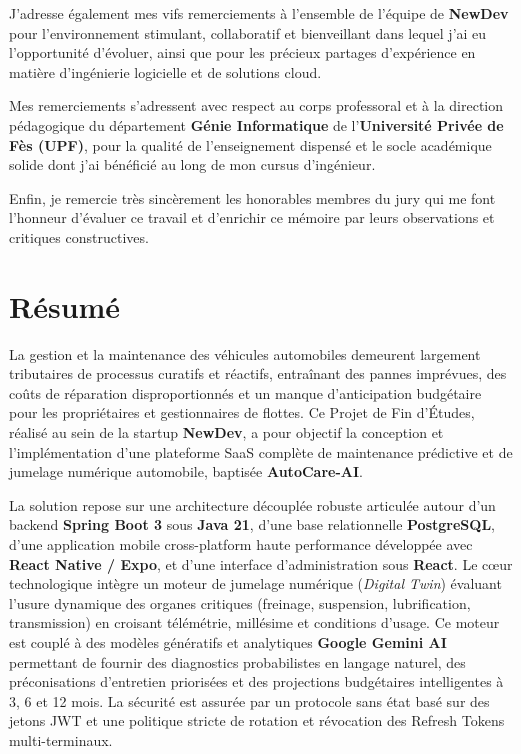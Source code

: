 \documentclass[12pt,a4paper,twoside,openright]{report}
\begin{document}
  J'adresse \'egalement mes vifs remerciements \`a l'ensemble de l'\'equipe de \textbf{NewDev} pour l'environnement stimulant, collaboratif et bienveillant dans lequel j'ai eu l'opportunit\'e d'\'evoluer, ainsi que pour les pr\'ecieux partages d'exp\'erience en mati\`ere d'ing\'enierie logicielle et de solutions cloud.

  Mes remerciements s'adressent avec respect au corps professoral et \`a la direction p\'edagogique du d\'epartement \textbf{G\'enie Informatique} de l'\textbf{Universit\'e Priv\'ee de F\`es (UPF)}, pour la qualit\'e de l'enseignement dispens\'e et le socle acad\'emique solide dont j'ai b\'en\'efici\'e au long de mon cursus d'ing\'enieur.

  Enfin, je remercie tr\`es sinc\`erement les honorables membres du jury qui me font l'honneur d'\'evaluer ce travail et d'enrichir ce m\'emoire par leurs observations et critiques constructives.

  \newpage

  \chapter*{R\'esum\'e}

  La gestion et la maintenance des v\'ehicules automobiles demeurent largement tributaires de processus curatifs et r\'eactifs, entra\^inant des pannes impr\'evues, des co\^uts de r\'eparation disproportionn\'es et un manque d'anticipation budg\'etaire pour les propri\'etaires et gestionnaires de flottes. Ce Projet de Fin d'\'Etudes, r\'ealis\'e au sein de la startup \textbf{NewDev}, a pour objectif la conception et l'impl\'ementation d'une plateforme SaaS compl\`ete de maintenance pr\'edictive et de jumelage num\'erique automobile, baptis\'ee \textbf{AutoCare-AI}.

  La solution repose sur une architecture d\'ecoupl\'ee robuste articul\'ee autour d'un backend \textbf{Spring Boot 3} sous \textbf{Java 21}, d'une base relationnelle \textbf{PostgreSQL}, d'une application mobile cross-platform haute performance d\'evelopp\'ee avec \textbf{React Native / Expo}, et d'une interface d'administration sous \textbf{React}. Le c\oe ur technologique int\`egre un moteur de jumelage num\'erique (\textit{Digital Twin}) \'evaluant l'usure dynamique des organes critiques (freinage, suspension, lubrification, transmission) en croisant t\'el\'em\'etrie, mill\'esime et conditions d'usage. Ce moteur est coupl\'e \`a des mod\`eles g\'en\'eratifs et analytiques \textbf{Google Gemini AI} permettant de fournir des diagnostics probabilistes en langage naturel, des pr\'econisations d'entretien prioris\'ees et des projections budg\'etaires intelligentes \`a 3, 6 et 12 mois. La s\'ecurit\'e est assur\'ee par un protocole sans \'etat bas\'e sur des jetons JWT et une politique stricte de rotation et r\'evocation des Refresh Tokens multi-terminaux.
\end{document}
